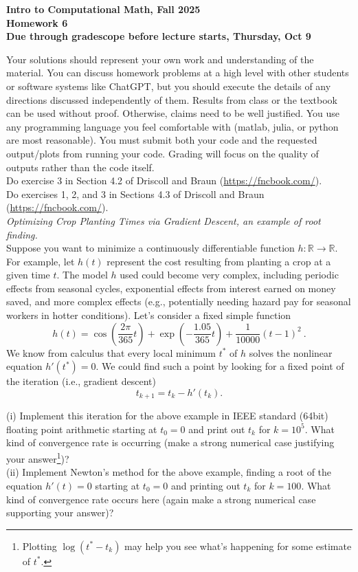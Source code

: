 \documentclass[11pt]{article}
\begin{document}
\begin{center}
{\bf Intro to Computational Math, Fall 2025\\
Homework 6\\
Due through gradescope before lecture starts, Thursday, Oct 9}
\end{center}

Your solutions should represent your own work and understanding of the material. You can discuss homework problems at a high level with other students or software systems like ChatGPT, but you should execute the details of any directions discussed independently of them. Results from class or the textbook can be used without proof. Otherwise, claims need to be well justified. You use any programming language you feel comfortable with (matlab, julia, or python are most reasonable). You must submit both your code and the requested output/plots from running your code. Grading will focus on the quality of outputs rather than the code itself.\\


 Do exercise 3 in Section 4.2 of Driscoll and Braun (\url{https://fncbook.com/}).\\

 Do exercises 1, 2, and 3 in Sections 4.3 of Driscoll and Braun (\url{https://fncbook.com/}).\\


 {\it Optimizing Crop Planting Times via Gradient Descent, an example of root finding.}\\
Suppose you want to minimize a continuously differentiable function $h\colon \mathbb{R}\rightarrow \mathbb{R}$. For example, let $h(t)$ represent the cost resulting from planting a crop at a given time $t$. The model $h$ used could become very complex, including periodic effects from seasonal cycles, exponential effects from interest earned on money saved, and more complex effects (e.g., potentially needing hazard pay for seasonal workers in hotter conditions). 
Let's consider a fixed simple function
$$ h(t) = \cos\left(\frac{2\pi}{365} t \right) + \exp\left(-\frac{1.05}{365} t\right) + \frac{1}{10000}(t-1)^2 \ . $$
We know from calculus that every local minimum $t^*$ of $h$ solves the nonlinear equation $h'(t^*)=0$. We could find such a point by looking for a fixed point of the iteration (i.e., gradient descent) $$ t_{k+1} = t_k - h'(t_k) . $$

\noindent (i) Implement this iteration for the above example in IEEE standard (64bit) floating point arithmetic starting at $t_0=0$ and print out $t_k$ for $k=10^5$. What kind of convergence rate is occurring (make a strong numerical case justifying your answer\footnote{Plotting $\log(t^*-t_k)$ may help you see what's happening for some estimate of $t^*$.})?\\

\noindent (ii) Implement Newton's method for the above example, finding a root of the equation $h'(t)=0$ starting at $t_0=0$ and printing out $t_k$ for $k=100$.
What kind of convergence rate occurs here (again make a strong numerical case supporting your answer)?\\
\end{document}
